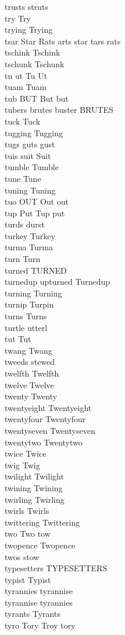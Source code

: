 trusts struts\\
try Try\\
trying Trying\\
tsar Star Rats arts star tars rats\\
tschink Tschink\\
tschunk Tschunk\\
tu ut Tu Ut\\
tuam Tuam\\
tub BUT But but\\
tubers brutes buster BRUTES\\
tuck Tuck\\
tugging Tugging\\
tugs guts gust\\
tuis suit Suit\\
tumble Tumble\\
tune Tune\\
tuning Tuning\\
tuo OUT Out out\\
tup Put Tup put\\
turds durst\\
turkey Turkey\\
turma Turma\\
turn Turn\\
turned TURNED\\
turnedup upturned Turnedup\\
turning Turning\\
turnip Turpin\\
turns Turns\\
turtle utterl\\
tut Tut\\
twang Twang\\
tweeds stewed\\
twelfth Twelfth\\
twelve Twelve\\
twenty Twenty\\
twentyeight Twentyeight\\
twentyfour Twentyfour\\
twentyseven Twentyseven\\
twentytwo Twentytwo\\
twice Twice\\
twig Twig\\
twilight Twilight\\
twining Twining\\
twirling Twirling\\
twirls Twirls\\
twittering Twittering\\
two Two tow\\
twopence Twopence\\
twos stow\\
typesetters TYPESETTERS\\
typist Typist\\
tyrannies tyrannise\\
tyrannise tyrannies\\
tyrants Tyrants\\
tyro Tory Troy tory\\

